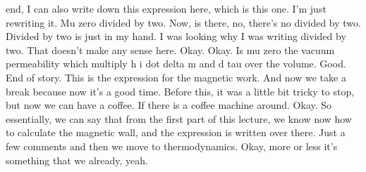end, I can also write down this expression here, which is this one. I'm just rewriting it. Mu zero divided by two. Now, is there, no, there's no divided by two. Divided by two is just in my hand. I was looking why I was writing divided by two. That doesn't make any sense here. Okay. Okay. Is mu zero the vacuum permeability which multiply h i dot delta m and d tau over the volume. Good. End of story. This is the expression for the magnetic work. And now we take a break because now it's a good time. Before this, it was a little bit tricky to stop, but now we can have a coffee. If there is a coffee machine around. Okay. So essentially, we can say that from the first part of this lecture, we know now how to calculate the magnetic wall, and the expression is written over there. Just a few comments and then we move to thermodynamics. Okay, more or less it's something that we already, yeah.
